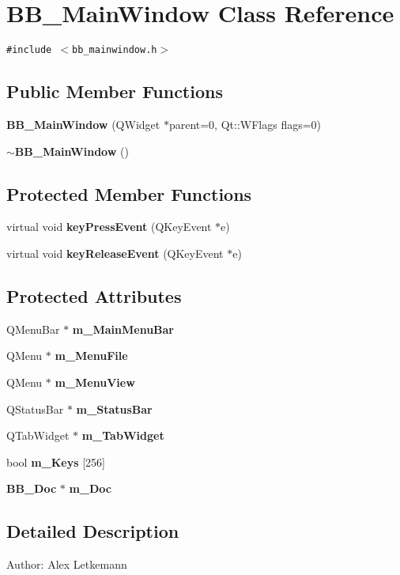 \section{BB\_\-Main\-Window Class Reference}
\label{classBB__MainWindow}
{\tt \#include $<$bb\_\-mainwindow.h$>$}

\subsection*{Public Member Functions}
\begin{CompactItemize}
\item 
{\bf BB\_\-Main\-Window} (QWidget $\ast$parent=0, Qt::WFlags flags=0)
\item 
{\bf $\sim$BB\_\-Main\-Window} ()
\end{CompactItemize}
\subsection*{Protected Member Functions}
\begin{CompactItemize}
\item 
virtual void {\bf key\-Press\-Event} (QKey\-Event $\ast$e)
\item 
virtual void {\bf key\-Release\-Event} (QKey\-Event $\ast$e)\label{classBB__MainWindow_b1}

\end{CompactItemize}
\subsection*{Protected Attributes}
\begin{CompactItemize}
\item 
QMenu\-Bar $\ast$ {\bf m\_\-Main\-Menu\-Bar}
\item 
QMenu $\ast$ {\bf m\_\-Menu\-File}
\item 
QMenu $\ast$ {\bf m\_\-Menu\-View}
\item 
QStatus\-Bar $\ast$ {\bf m\_\-Status\-Bar}
\item 
QTab\-Widget $\ast$ {\bf m\_\-Tab\-Widget}
\item 
bool {\bf m\_\-Keys} [256]\label{classBB__MainWindow_p5}

\item 
{\bf BB\_\-Doc} $\ast$ {\bf m\_\-Doc}\label{classBB__MainWindow_p6}

\end{CompactItemize}


\subsection{Detailed Description}
\begin{Desc}
\item[Author:]Alex Letkemann \end{Desc}




